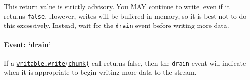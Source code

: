 This return value is strictly advisory. You MAY continue to write, even
if it returns \texttt{false}. However, writes will be buffered in
memory, so it is best not to do this excessively. Instead, wait for the
\texttt{drain} event before writing more data.

\paragraph{\texorpdfstring{Event:
`drain'}{Event: drain}}\label{event-drain}

If a
\hyperref[streamux5fwritableux5fwriteux5fchunkux5fencodingux5fcallback]{\texttt{writable.write(chunk)}}
call returns false, then the \texttt{drain} event will indicate when it
is appropriate to begin writing more data to the stream.

\begin{Shaded}
\begin{Highlighting}[]
 
   \NormalTok{;}
  \NormalTok{();}
   \NormalTok{() \{}
     \NormalTok{;}
     \NormalTok{\{}
      \NormalTok{;}
       \NormalTok{) \{}
      \NormalTok{\} } \NormalTok{\{}
      \NormalTok{\}}
    \NormalTok{\} }  
     \NormalTok{) \{}
      \NormalTok{(}
    \NormalTok{\}}
  \NormalTok{\}}
\NormalTok{\}}
\end{Highlighting}
\end{Shaded}

